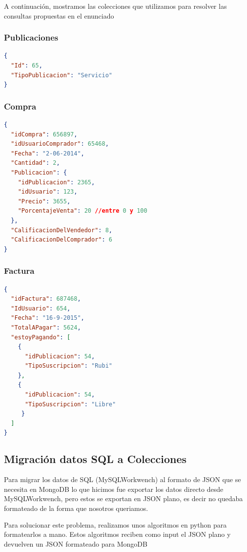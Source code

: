 \documentclass[a4paper, 10pt, twoside]{article}
\begin{document}
A continuaci\'on, mostramos las colecciones que utilizamos para resolver las consultas propuestas en el enunciado

\subsubsection{Publicaciones}

\begin{lstlisting}[language=json,firstnumber=1]
{
  "Id": 65,
  "TipoPublicacion": "Servicio"
}
\end{lstlisting}

\subsubsection{Compra}


\begin{lstlisting}[language=json,firstnumber=1]
{
  "idCompra": 656897,
  "idUsuarioComprador": 65468,
  "Fecha": "2-06-2014",
  "Cantidad": 2,
  "Publicacion": {
    "idPublicacion": 2365,
    "idUsuario": 123,
    "Precio": 3655,
    "PorcentajeVenta": 20 //entre 0 y 100
  },
  "CalificacionDelVendedor": 8,
  "CalificacionDelComprador": 6
}
\end{lstlisting}


\subsubsection{Factura}

\begin{lstlisting}[language=json,firstnumber=1]
{
  "idFactura": 687468,
  "IdUsuario": 654,
  "Fecha": "16-9-2015",
  "TotalAPagar": 5624,
  "estoyPagando": [
    {
      "idPublicacion": 54,
      "TipoSuscripcion": "Rubi"
    },
    {
      "idPublicacion": 54,
      "TipoSuscripcion": "Libre"
     }
  ]
}
\end{lstlisting}
\newpage
\subsection{Migraci\'on datos SQL a Colecciones}
Para migrar los datos de SQL (MySQLWorkwench) al formato de JSON que se necesita en MongoDB lo que hicimos fue exportar los datos directo desde MySQLWorkwench, pero estos se exportan en JSON plano, es decir no quedaba formateado de la forma que nosotros queriamos. 

Para solucionar este problema, realizamos unos algoritmos en python para formatearlos a mano. Estos algoritmos reciben como input el JSON plano y devuelven un JSON formateado para MongoDB
\end{document}
